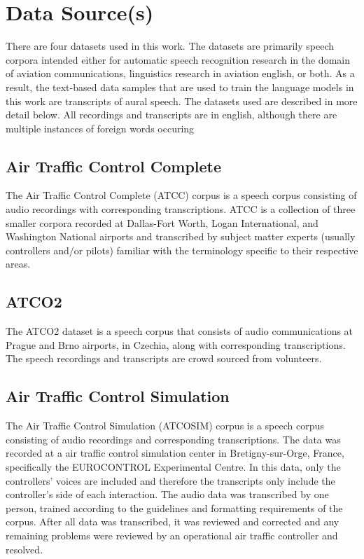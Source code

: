 \documentclass[12pt]{article}
\begin{document}
\section{Data Source(s)}
There are four datasets used in this work. The datasets are primarily speech corpora intended either for automatic speech recognition
research in the domain of aviation communications, linguistics research in aviation english, or both. As a result, the text-based data
samples that are used to train the language models in this work are transcripts of aural speech. The datasets used are described in more
detail below. All recordings and transcripts are in english, although there are multiple instances of foreign words occuring

\subsection{Air Traffic Control Complete}
The Air Traffic Control Complete (ATCC) corpus is a speech corpus consisting of audio recordings with corresponding transcriptions.
ATCC is a collection of three smaller corpora recorded at Dallas-Fort Worth, Logan International, and Washington National airports and
transcribed by subject matter experts (usually controllers and/or pilots) familiar with the terminology specific to their respective
areas\cite{godfrey_air_1994}.

\subsection{ATCO2}
The ATCO2 dataset is a speech corpus that consists of audio communications at Prague and Brno airports, in Czechia, along with corresponding
transcriptions. The speech recordings and transcripts are crowd sourced from volunteers\cite{szoke_detecting_2021}.


\subsection{Air Traffic Control Simulation}
The Air Traffic Control Simulation (ATCOSIM) corpus is a speech corpus consisting of audio recordings and corresponding transcriptions.
The data was recorded at a air traffic control simulation center in Bretigny-sur-Orge, France, specifically the EUROCONTROL Experimental Centre.
In this data, only the controllers' voices are included and therefore the transcripts only include the controller's side of each interaction.
The audio data was transcribed by one person, trained according to the guidelines and formatting requirements of the corpus. After all data was
transcribed, it was reviewed and corrected and any remaining problems were reviewed by an operational air traffic controller and
resolved\cite{hofbauer_atcosim_2008}.
\end{document}
